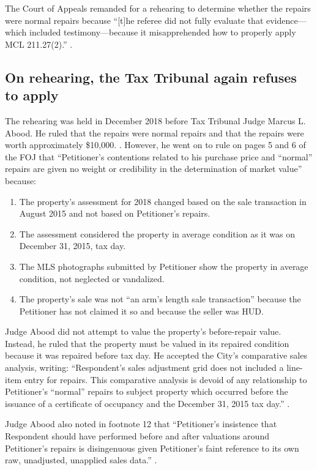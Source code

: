 \documentclass[12pt,\documentclassflag]{michiganCourtOfAppealsBrief}
\begin{document}
The Court of Appeals remanded for a rehearing to determine whether the repairs were normal repairs because ``[t]he referee did not fully evaluate that evidence---which included testimony---because it misapprehended how to properly apply MCL 211.27(2).'' .

\subsection{On rehearing, the Tax Tribunal again refuses to apply \mathieuGast}

The rehearing was held in December 2018 before Tax Tribunal Judge Marcus L. Abood. He ruled that the repairs were normal repairs and that the repairs were worth approximately \$10,000. \foj[4]. However, he went on to rule on pages 5 and 6 of the FOJ that ``Petitioner's contentions related to his purchase price and ``normal'' repairs are given no weight or credibility in the determination of market value'' because:
\begin{enumerate}
\item The property's assessment for 2018 changed based on the sale transaction in August 2015 and not based on Petitioner's repairs. 
\item The assessment considered the property in average condition as it was on December 31, 2015, tax day.
\item The MLS photographs submitted by Petitioner show the property in average condition, not neglected or vandalized.
\item The property's sale was not ``an arm's length sale transaction'' because the Petitioner has not claimed it so and because the seller was HUD.
\end{enumerate}

Judge Abood did not attempt to value the property's before-repair value. Instead, he ruled that the property must be valued in its repaired condition because it was repaired before tax day. He accepted the City's comparative sales analysis, writing: ``Respondent's sales adjustment grid does not included a line-item entry for repairs. This comparative analysis is devoid of any relationship to Petitioner's ``normal'' repairs to subject property which occurred before the issuance of a certificate of occupancy and the December 31, 2015 tax day.'' \foj[6].

Judge Abood also noted in footnote 12 that ``Petitioner's insistence that Respondent should have performed before and after valuations around Petitioner's repairs is disingenuous given Petitioner's faint reference to its own raw, unadjusted, unapplied sales data.'' \foj[5].
\end{document}
